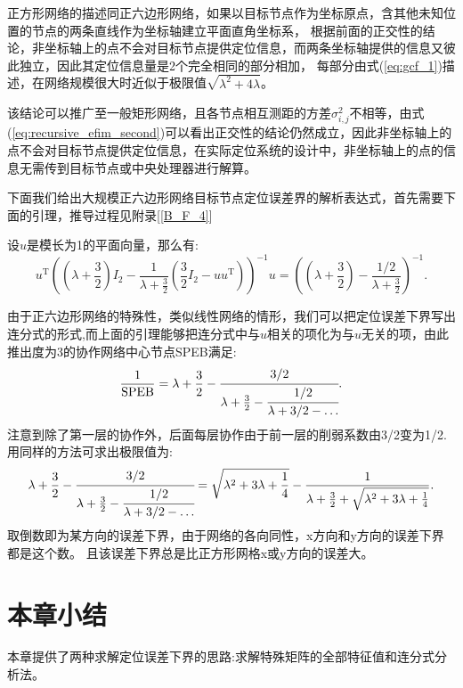 正方形网络的描述同正六边形网络，如果以目标节点作为坐标原点，含其他未知位置的节点的两条直线作为坐标轴建立平面直角坐标系，
根据前面的正交性的结论，非坐标轴上的点不会对目标节点提供定位信息，而两条坐标轴提供的信息又彼此独立，因此其定位信息量是2个完全相同的部分相加，
每部分由式(\ref{eq:gcf_1})描述，在网络规模很大时近似于极限值$\sqrt{\lambda^2+4\lambda}$。

该结论可以推广至一般矩形网络，且各节点相互测距的方差$\sigma^2_{i,j}$不相等，由式(\ref{eq:recursive_efim_second})可以看出正交性的结论仍然成立，因此非坐标轴上的点不会对目标节点提供定位信息，在实际定位系统的设计中，非坐标轴上的点的信息无需传到目标节点或中央处理器进行解算。

下面我们给出大规模正六边形网络目标节点定位误差界的解析表达式，首先需要下面的引理，推导过程见附录[\ref{B_F_4}]
\begin{lemma}\label{lemma:hexagon}
  设$u$是模长为1的平面向量，那么有:
\begin{equation}\label{eq:equiv}
  u^{\textrm{T}} ((\lambda+\frac{3}{2})I_2-\frac{1}{\lambda+\frac{3}{2}}(\frac{3}{2}I_2-uu^{\textrm{T}} ))^{-1}u
  =((\lambda+\frac{3}{2})-\frac{1/2}{\lambda+\frac{3}{2}})^{-1}.
\end{equation}
\end{lemma}
  由于正六边形网络的特殊性，类似线性网络的情形，我们可以把定位误差下界写出连分式的形式,而上面的引理能够把连分式中与$u$相关的项化为与$u$无关的项，由此推出度为3的协作网络中心节点SPEB满足:
  \begin{equation}
\frac{1}{\text{SPEB}}=\lambda+\frac{3}{2}-\cfrac{3/2}{\lambda+\frac{3}{2}-\cfrac{1/2}{\lambda+3/2-\dots}}.
  \end{equation}
  注意到除了第一层的协作外，后面每层协作由于前一层的削弱系数由3/2变为1/2.
  用同样的方法可求出极限值为:
  \begin{equation}
  \lambda+\frac{3}{2}-\cfrac{3/2}{\lambda+\frac{3}{2}-\cfrac{1/2}{\lambda+3/2-\dots}}=\sqrt{\lambda^2+3\lambda+\frac{1}{4}}-\frac{1}{\lambda+\frac{3}{2}+\sqrt{\lambda^2+3\lambda+\frac{1}{4}}}.
  \end{equation}
  取倒数即为某方向的误差下界，由于网络的各向同性，x方向和y方向的误差下界都是这个数。
且该误差下界总是比正方形网格x或y方向的误差大。

\section{本章小结}\label{section:conclusion4}
   本章提供了两种求解定位误差下界的思路:求解特殊矩阵的全部特征值和连分式分析法。

